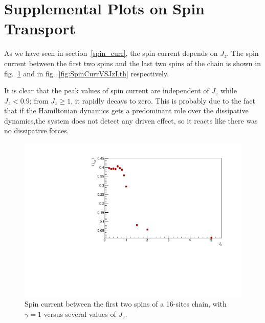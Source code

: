 \section{Supplemental Plots on Spin Transport}
As we have seen in section~\ref{spin_curr}, the spin current depends on $J_z$. The spin current between the first two spins and the last two spins of the chain is shown in fig.~\ref{fig:SpinCurrVSJz1st} and in fig.~\ref{fig:SpinCurrVSJzLth} respectively. 

It is clear that the peak values of spin current are independent of $J_z$ while $J_z < 0.9$; from $J_z \geq 1$, it rapidly decays to zero. This is probably due to the fact that if the Hamiltonian dynamics gets a predominant role over the dissipative dynamics,the system does not detect any driven effect, so it reacts like there was no dissipative forces.

\begin{figure}[H]
    \centering
    \captionsetup{width=1.\linewidth}
    \includegraphics[scale=0.6]{Figures/SpinCurrVSJz1st.pdf}
    \caption{Spin current between the first two spins of a 16-sites chain, with $\gamma=1$ versus several values of $J_z$.}
    \label{fig:SpinCurrVSJz1st}
\end{figure}


